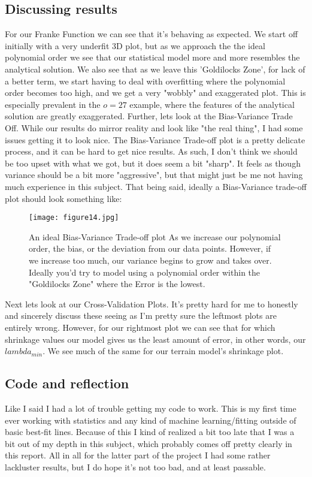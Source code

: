 \documentclass{article}
\begin{document}
\subsection*{Discussing results}
For our Franke Function we can see that it's behaving as expected. We start off initially with a very underfit 3D plot, but as we approach the the ideal polynomial order we see that our statistical model more and more resembles the analytical solution. We also see that as we leave this 'Goldilocks Zone', for lack of a better term, we start having to deal with overfitting where the polynomial order becomes too high, and we get a very "wobbly" and exaggerated plot. This is especially prevalent in the $o = 27$ example, where the features of the analytical solution are greatly exaggerated. \newline
Further, lets look at the Bias-Variance Trade Off. While our results do mirror reality and look like "the real thing", I had some issues getting it to look nice. The Bias-Variance Trade-off plot is a pretty delicate process, and it can be hard to get nice results. As such, I don't think we should be too upset with what we got, but it does seem a bit "sharp". It feels as though variance should be a bit more "aggressive", but that might just be me not having much experience in this subject. That being said, ideally a Bias-Variance trade-off plot should look something like:
\begin{figure}[ht!]
    \centering
    \texttt{[image: figure14.jpg]}
    \caption{An ideal Bias-Variance Trade-off plot \newline
    As we increase our polynomial order, the bias, or the deviation from our data points. However, if we increase too much, our variance begins to grow and takes over. Ideally you'd try to model using a polynomial order within the "Goldilocks Zone" where the Error is the lowest.}
    \label{fig3}
\end{figure}
\newpage
Next lets look at our Cross-Validation Plots. It's pretty hard for me to honestly and sincerely discuss these seeing as I'm pretty sure the leftmost plots are entirely wrong. However, for our rightmost plot we can see that for which shrinkage values our model gives us the least amount of error, in other words, our $lambda_{min}$.
We see much of the same for our terrain model's shrinkage plot. \newline
\subsection*{Code and reflection}
Like I said I had a lot of trouble getting my code to work. This is my first time ever working with statistics and any kind of machine learning/fitting outside of basic best-fit lines. Because of this I kind of realized a bit too late that I was a bit out of my depth in this subject, which probably comes off pretty clearly in this report.
\newline All in all for the latter part of the project I had some rather lackluster results, but I do hope it's not too bad, and at least passable.
\end{document}
